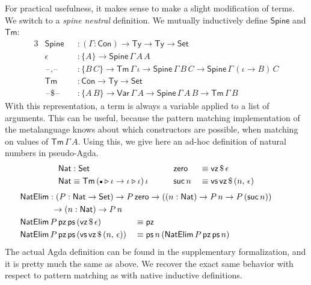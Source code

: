 \documentclass[12pt,a4paper,twoside,openany]{book}
\theoremstyle{remark}
\theoremstyle{definition}
\newcommand{\ms}[1]{\mathsf{#1}}
\newcommand{\Con}{\mathsf{Con}}
\newcommand{\Tm}{\mathsf{Tm}}
\newcommand{\Ty}{\mathsf{Ty}}
\newcommand{\blank}{\mathord{\hspace{1pt}\text{--}\hspace{1pt}}}
\newcommand{\Set}{\mathsf{Set}}
\newcommand{\ext}{\triangleright}
\newcommand{\emptycon}{\scaleobj{.75}\bullet}
\newcommand{\Var}{\ms{Var}}
\newcommand{\vz}{\ms{vz}}
\newcommand{\vs}{\ms{vs}}
\newcommand{\Nat}{\ms{Nat}}
\begin{document}
For practical usefulness, it makes sense to make a slight modification of
terms. We switch to a \emph{spine neutral} definition. We mutually inductively
define $\ms{Spine}$ and $\Tm$:
\begin{alignat*}{3}
  & \ms{Spine} &&: (\Gamma : \Con) \to \Ty \to \Ty \to \Set \\
  & \epsilon &&: \{A\} \to \ms{Spine}\,\Gamma\,A\,A\\
  & \blank\!,\!\blank &&: \{B\,C\} \to \Tm\,\Gamma\,\iota \to \ms{Spine}\,\Gamma\,B\,C \to \ms{Spine}\,\Gamma\,(\iota\to B)\,C\\
  & \Tm  &&: \Con \to \Ty \to \Set \\
  & \blank\$\blank &&: \{A\,B\} \to \Var\,\Gamma\,A \to \ms{Spine}\,\Gamma\,A\,B \to \Tm\,\Gamma\,B
\end{alignat*}
With this representation, a term is always a variable applied to a list of
arguments. This can be useful, because the pattern matching implementation of
the metalanguage knows about which constructors are possible, when matching
on values of $\Tm\,\Gamma\,A$. Using this, we give here an ad-hoc definition of
natural numbers in pseudo-Agda.
\begin{alignat*}{3}
  &\Nat : \Set && \ms{zero} &&\equiv \vz\,\$\,\epsilon\\
  &\Nat \equiv \Tm\,(\emptycon\ext \iota\to \iota \ext \iota)\,\iota\hspace{2em} && \ms{suc}\,n &&\equiv \vs\,\vz\,\$\,(n,\,\epsilon)
\end{alignat*}
\begin{alignat*}{3}
  &\hspace{-6.5em}\rlap{$\ms{NatElim} : (P : \Nat \to \Set) \to P\,\ms{zero}\to ((n : \Nat) \to P\,n \to P\,(\ms{suc}\,n))$}\\
  &\hspace{-6.5em}\rlap{$\hspace{4em}\to (n : \Nat) \to P\,n$}\\
  &\hspace{-6.5em}\ms{NatElim}\,P\,\ms{pz}\,\ms{ps}\,(\vz\,\$\,\epsilon) &&\equiv \ms{pz}\\
  &\hspace{-6.5em}\ms{NatElim}\,P\,\ms{pz}\,\ms{ps}\,(\vs\,\vz\,\$\,(n,\,\epsilon)) &&\equiv
    \ms{ps}\,n\,(\ms{NatElim}\,P\,\ms{pz}\,\ms{ps}\,n)
\end{alignat*}
The actual Agda definition can be found in the supplementary formalization, and
it is pretty much the same as above. We recover the exact same behavior with
respect to pattern matching as with native inductive definitions.
\end{document}
